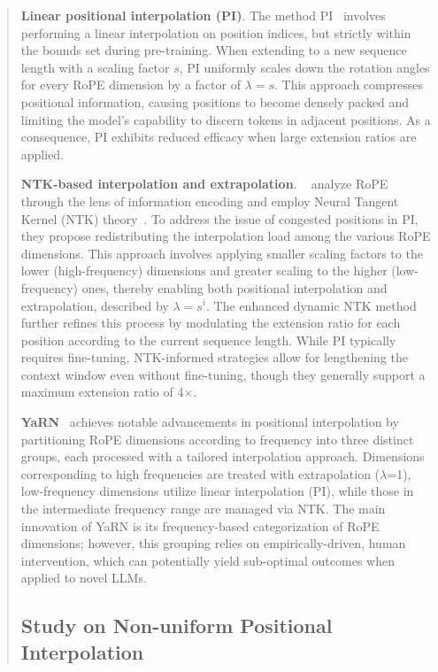 \begin{abstract}
\textbf{Linear positional interpolation (PI)}. The method PI~\cite{pi} involves performing a linear interpolation on position indices, but strictly within the bounds set during pre-training. When extending to a new sequence length with a scaling factor $s$, PI uniformly scales down the rotation angles for every RoPE dimension by a factor of $\lambda=s$. This approach compresses positional information, causing positions to become densely packed and limiting the model’s capability to discern tokens in adjacent positions. As a consequence, PI exhibits reduced efficacy when large extension ratios are applied.

\textbf{NTK-based interpolation and extrapolation}. ~\cite{ntk,dynamicntk} analyze RoPE through the lens of information encoding and employ Neural Tangent Kernel (NTK) theory~\cite{jacot2018neural,tancik2020fourier}. To address the issue of congested positions in PI, they propose redistributing the interpolation load among the various RoPE dimensions. This approach involves applying smaller scaling factors to the lower (high-frequency) dimensions and greater scaling to the higher (low-frequency) ones, thereby enabling both positional interpolation and extrapolation, described by $\lambda=s^{i}$. The enhanced dynamic NTK method~\cite{dynamicntk} further refines this process by modulating the extension ratio for each position according to the current sequence length. While PI typically requires fine-tuning, NTK-informed strategies allow for lengthening the context window even without fine-tuning, though they generally support a maximum extension ratio of 4$\times$.

\textbf{YaRN}~\cite{yarn} achieves notable advancements in positional interpolation by partitioning RoPE dimensions according to frequency into three distinct groups, each processed with a tailored interpolation approach. Dimensions corresponding to high frequencies are treated with extrapolation ($\lambda$=1), low-frequency dimensions utilize linear interpolation (PI), while those in the intermediate frequency range are managed via NTK. The main innovation of YaRN is its frequency-based categorization of RoPE dimensions; however, this grouping relies on empirically-driven, human intervention, which can potentially yield sub-optimal outcomes when applied to novel LLMs.

\subsection{Study on Non-uniform Positional Interpolation}


\end{abstract}
